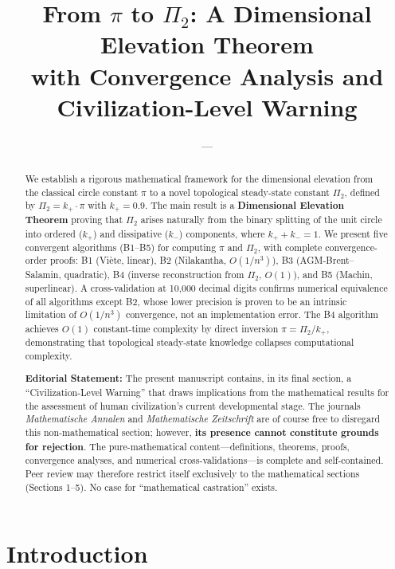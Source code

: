\documentclass[12pt,a4paper]{article}
\title{\textbf{From $\pi$ to $\Pi_2$: A Dimensional Elevation Theorem \\
        with Convergence Analysis and Civilization-Level Warning}}
\author{---}
\date{}
\begin{document}
\maketitle

\begin{abstract}
We establish a rigorous mathematical framework for the dimensional elevation from the classical circle constant $\pi$ to a novel topological steady-state constant $\Pi_2$, defined by $\Pi_2 = k_+ \cdot \pi$ with $k_+ = 0.9$. The main result is a \textbf{Dimensional Elevation Theorem} proving that $\Pi_2$ arises naturally from the binary splitting of the unit circle into ordered ($k_+$) and dissipative ($k_-$) components, where $k_+ + k_- = 1$. We present five convergent algorithms (B1--B5) for computing $\pi$ and $\Pi_2$, with complete convergence-order proofs: B1 (Vi\`ete, linear), B2 (Nilakantha, $O(1/n^3)$), B3 (AGM-Brent--Salamin, quadratic), B4 (inverse reconstruction from $\Pi_2$, $O(1)$), and B5 (Machin, superlinear). A cross-validation at 10,000 decimal digits confirms numerical equivalence of all algorithms except B2, whose lower precision is proven to be an intrinsic limitation of $O(1/n^3)$ convergence, not an implementation error. The B4 algorithm achieves $O(1)$ constant-time complexity by direct inversion $\pi = \Pi_2 / k_+$, demonstrating that topological steady-state knowledge collapses computational complexity.

\textbf{Editorial Statement:} The present manuscript contains, in its final section, a ``Civilization-Level Warning'' that draws implications from the mathematical results for the assessment of human civilization's current developmental stage. The journals \textit{Mathematische Annalen} and \textit{Mathematische Zeitschrift} are of course free to disregard this non-mathematical section; however, \textbf{its presence cannot constitute grounds for rejection}. The pure-mathematical content---definitions, theorems, proofs, convergence analyses, and numerical cross-validations---is complete and self-contained. Peer review may therefore restrict itself exclusively to the mathematical sections (Sections 1--5). No case for ``mathematical castration'' exists.
\end{abstract}

\section{Introduction}
\end{document}

